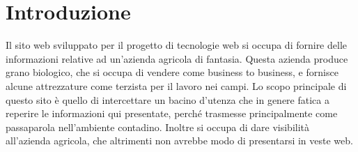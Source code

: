 \newpage
\section{Introduzione}
Il sito web sviluppato per il progetto di tecnologie web si occupa di fornire delle informazioni relative ad un'azienda agricola di fantasia. Questa azienda produce grano biologico, che si occupa di vendere come business to business, e fornisce alcune attrezzature come terzista per il lavoro nei campi.
Lo scopo principale di questo sito è quello di intercettare un bacino d'utenza che in genere fatica a reperire le informazioni qui presentate, perché trasmesse principalmente come passaparola nell'ambiente contadino. Inoltre si occupa di dare visibilità all'azienda agricola, che altrimenti non avrebbe modo di presentarsi in veste web.
